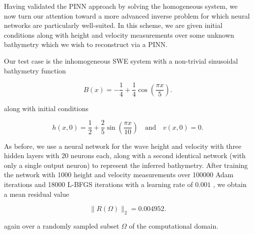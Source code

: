 Having validated the PINN approach by solving the homogeneous system, we now turn our attention toward a more advanced
inverse problem for which neural networks are particularly well-suited. In this scheme, we are given initial conditions 
along with height and velocity measurements over some unknown bathymetry which we wish to reconstruct via a PINN. 

Our test case is the inhomogeneous SWE system with a non-trivial sinusoidal bathymetry function

$$
B(x) = -\frac{1}{4} + \frac{1}{4} \cos{\left( \frac{\pi x}{5} \right)}.
$$

\noindent along with initial conditions

$$
h(x, 0) = \frac{1}{2} + \frac{2}{5} \sin{\left( \frac{\pi x}{10} \right)} \quad \text{and} \quad v(x, 0) = 0.
$$

As before, we use a neural network for the wave height and velocity with three hidden layers with 20 neurons each, along
with a second identical network (with only a single output neuron) to represent the inferred bathymetry. After training 
the network with 1000 height and velocity measurements over 100000 Adam iterations and 18000 L-BFGS iterations with a 
learning rate of $0.001$ , we obtain a mean residual value

$$
\lVert R(\Omega) \rVert_2 = 0.004952.
$$

\noindent again over a randomly sampled subset $\Omega$ of the computational domain.


